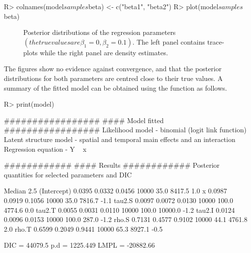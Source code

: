\documentclass[article, nojss]{jss}
\begin{document}
\begin{CodeInput}
R> colnames(model$samples$beta) <- c("beta1", "beta2")
R> plot(model$samples$beta)
\end{CodeInput}

\begin{figure}
\centering 
{}
\caption{Posterior distributions of the regression parameters $(the true values are \beta_1=0, \beta_2=0.1)$. The left panel contains trace-plots while the right panel are density estimates.\label{fig sim1}}
\end{figure} 


The figures show no evidence against convergence, and that the posterior distributions for both parameters are centred close to their true values. A summary of the fitted model can be obtained using the  function as follows.

\begin{CodeInput}
R> print(model)
\end{CodeInput}

\begin{CodeOutput}
#################
#### Model fitted
#################
Likelihood model - binomial (logit link function) 
Latent structure model - spatial and temporal main effects and an interaction
Regression equation - Y ~ x

############
#### Results
############
Posterior quantities for selected parameters and DIC

            Median    2.5%
(Intercept) 0.0395  0.0332 0.0456    10000     35.0      8417.5         1.0
x           0.0987  0.0919 0.1056    10000     35.0      7816.7        -1.1
tau2.S      0.0097  0.0072 0.0130    10000    100.0      4774.6         0.0
tau2.T      0.0055  0.0031 0.0110    10000    100.0     10000.0        -1.2
tau2.I      0.0124  0.0096 0.0153    10000    100.0       287.0        -1.2
rho.S       0.7131  0.4577 0.9102    10000     44.1      4761.8         2.0
rho.T       0.6599  0.2049 0.9441    10000     65.3      8927.1        -0.5

DIC =  44079.5       p.d =  1225.449       LMPL =  -20882.66 
\end{CodeOutput}
\end{document}

